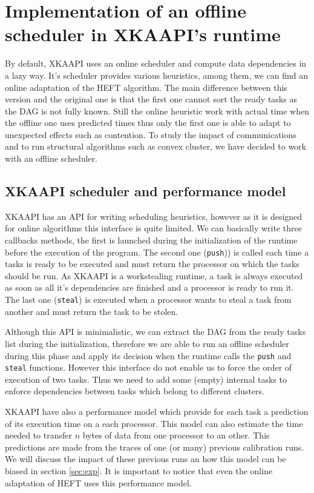 \documentclass[10pt, conference, compsocconf,pdftex,dvipsnames]{IEEEtran}
\begin{document}
\section{Implementation of an offline scheduler in XKAAPI's runtime}
\label{sec:impl}

By default, XKAAPI uses an online scheduler and compute data dependencies in a
lazy way. It's scheduler provides various heuristics, among them, we can find an
online adaptation of the HEFT algorithm. The main difference between this
version and the original one is that the first one cannot sort the ready tasks
as the DAG is not fully known.  Still the online heuristic work with actual
time when the offline one uses predicted times thus only the first one is able
to adapt to unexpected effects such as contention. To study the impact of
communications and to run structural algorithms such as convex cluster, we
have decided to work with an offline scheduler.

\subsection{XKAAPI scheduler and performance model}
\label{sec:impl-kaapi}

XKAAPI has an API for writing scheduling heuristics, however as it is designed
for online algorithms this interface is quite limited. We can basically write
three callbacks methods, the first is launched during the initialization of
the runtime before the execution of the program. The second one
(\texttt{push})) is called each time a tasks is ready to be executed and must
return the processor on which the tasks should be run. As XKAAPI is a
workstealing runtime, a task is always executed as soon as all it's
dependencies are finished and a processor is ready to run it. The last one
(\texttt{steal}) is executed when a processor wants to steal a task from
another and must return the task to be stolen.

Although this API is minimalistic, we can extract the DAG from the ready tasks
list during the initialization, therefore we are able to run an offline
scheduler during this phase and apply its decision when the runtime calls the
\texttt{push} and \texttt{steal} functions. However this interface do not
enable us to force the order of execution of two tasks. Thus we need to add
some (empty) internal tasks to enforce dependencies between tasks which belong
to different clusters.

XKAAPI have also a performance model which provide for each task a prediction
of its execution time on a each processor. This model can also estimate the 
time needed to transfer $n$ bytes of data from one processor to an other. This
predictions are made from the traces of one (or many) previous calibration
runs. We will discuss the impact of these previous runs an how this model can
be biased in section \ref{sec:exp}. It is important to notice that even the
online adaptation of HEFT uses this performance model.
\end{document}
